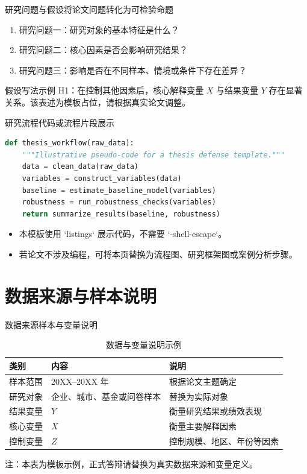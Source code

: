 \documentclass[aspectratio=169,11pt]{beamer}
\begin{document}
\begin{frame}{研究问题与假设}{将论文问题转化为可检验命题}
  \begin{enumerate}
    \item 研究问题一：研究对象的基本特征是什么？
    \item 研究问题二：核心因素是否会影响研究结果？
    \item 研究问题三：影响是否在不同样本、情境或条件下存在差异？
  \end{enumerate}
  \begin{alertblock}{假设写法示例}
    H1：在控制其他因素后，核心解释变量 $X$ 与结果变量 $Y$ 存在显著关系。该表述为模板占位，请根据真实论文调整。
  \end{alertblock}
\end{frame}

\begin{frame}[fragile]{研究流程}{代码或流程片段展示}
  \begin{lstlisting}[language=Python]
def thesis_workflow(raw_data):
    """Illustrative pseudo-code for a thesis defense template."""
    data = clean_data(raw_data)
    variables = construct_variables(data)
    baseline = estimate_baseline_model(variables)
    robustness = run_robustness_checks(variables)
    return summarize_results(baseline, robustness)
  \end{lstlisting}
  \begin{itemize}
    \item 本模板使用 `listings` 展示代码，不需要 `-shell-escape`。
    \item 若论文不涉及编程，可将本页替换为流程图、研究框架图或案例分析步骤。
  \end{itemize}
\end{frame}

\section{数据来源与样本说明}

\begin{frame}{数据来源}{样本与变量说明}
  \begin{table}
    \centering
    \caption{数据与变量说明示例}
    \begin{tabular}{lll}
      \toprule
      类别 & 内容 & 说明 \\
      \midrule
      样本范围 & 20XX--20XX 年 & 根据论文主题确定 \\
      研究对象 & 企业、城市、基金或问卷样本 & 替换为实际对象 \\
      结果变量 & $Y$ & 衡量研究结果或绩效表现 \\
      核心变量 & $X$ & 衡量主要解释因素 \\
      控制变量 & $Z$ & 控制规模、地区、年份等因素 \\
      \bottomrule
    \end{tabular}
  \end{table}
  \vspace{-0.3em}
  \scriptsize 注：本表为模板示例，正式答辩请替换为真实数据来源和变量定义。
\end{frame}
\end{document}
